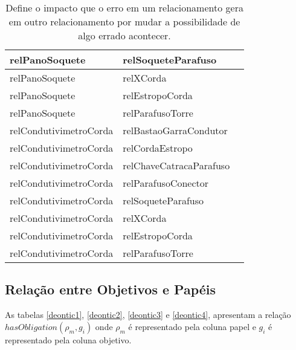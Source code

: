\begin{table}[H]
\begin{tabular}{|l|l|l|}
relPanoSoquete                                  & relSoqueteParafuso                               \\ \hline
relPanoSoquete                                  & relXCorda                                        \\ \hline
relPanoSoquete                                  & relEstropoCorda                                  \\ \hline
relPanoSoquete                                  & relParafusoTorre                                 \\ \hline
relCondutivimetroCorda                          & relBastaoGarraCondutor                           \\ \hline
relCondutivimetroCorda                          & relCordaEstropo                                  \\ \hline
relCondutivimetroCorda                          & relChaveCatracaParafuso                          \\ \hline
relCondutivimetroCorda                          & relParafusoConector                              \\ \hline
relCondutivimetroCorda                          & relSoqueteParafuso                               \\ \hline
relCondutivimetroCorda                          & relXCorda                                        \\ \hline
relCondutivimetroCorda                          & relEstropoCorda                                  \\ \hline
relCondutivimetroCorda                          & relParafusoTorre                                 \\ \hline
\end{tabular}
\caption{Define o impacto que o erro em um relacionamento gera em outro relacionamento por mudar a possibilidade de algo errado acontecer.}
\label{relation3}
\end{table}

\subsection{Relação entre Objetivos e Papéis}

As tabelas \ref{deontic1}, \ref{deontic2}, \ref{deontic3} e \ref{deontic4},  apresentam a relação $hasObligation(\rho_m,g_i)$ onde $\rho_m$ é representado pela coluna papel e $g_i$ é representado pela coluna objetivo. 


